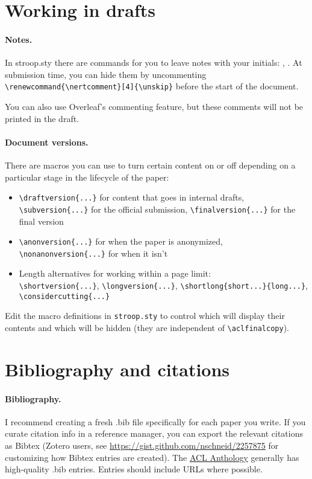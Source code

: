 \section{Working in drafts}

\paragraph{Notes.}
In stroop.sty there are commands for you to leave notes with your initials:
,
.
At submission time, you can hide them by uncommenting
\verb|\renewcommand{\nertcomment}[4]{\unskip}| before the start of the document.

You can also use Overleaf's commenting feature, but these comments will not be printed in the draft.

\paragraph{Document versions.}
There are macros you can use to turn certain content on or off
depending on a particular stage in the lifecycle of the paper:
\begin{itemize}
    \item \verb|\draftversion{...}| for content that goes in internal drafts, \verb|\subversion{...}| for the official submission, \verb|\finalversion{...}| for the final version
    \item \verb|\anonversion{...}| for when the paper is anonymized,
    \verb|\nonanonversion{...}| for when it isn't
    \item Length alternatives for working within a page limit:\\ \verb|\shortversion{...}|, \verb|\longversion{...}|, \verb|\shortlong{short...}{long...}|, \verb|\considercutting{...}|
\end{itemize}
Edit the macro definitions in \verb|stroop.sty| to control which will display
their contents and which will be hidden
(they are independent of \verb|\aclfinalcopy|).

\section{Bibliography and citations}\label{sec:bib}

\paragraph{Bibliography.}
I recommend creating a fresh .bib file specifically for each paper you write.
If you curate citation info in a reference manager, you can export the relevant
citations as Bibtex
(Zotero users, see \url{https://gist.github.com/nschneid/2257875} for customizing
how Bibtex entries are created).
The \href{https://www.aclweb.org/anthology/}{ACL Anthology} generally has high-quality .bib entries.
Entries should include URLs where possible.

